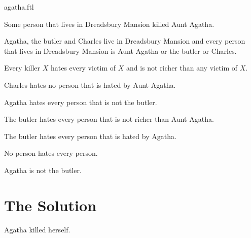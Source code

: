 \documentclass{article}
\begin{document}
\begin{smodule}{agatha.ftl}
  \begin{forthel}
    \begin{axiom}
      Some person that lives in Dreadsbury Mansion killed Aunt Agatha.
    \end{axiom}
    \begin{axiom}
      Agatha, the butler and Charles live in Dreadsbury Mansion and every person that lives in Dreadsbury Mansion is Aunt Agatha or the butler or Charles.
    \end{axiom}
    \begin{axiom}
      Every killer $X$ hates every victim of $X$ and is not richer than any victim of $X$.
    \end{axiom}
    \begin{axiom}
      Charles hates no person that is hated by Aunt Agatha.
    \end{axiom}
    \begin{axiom}
      Agatha hates every person that is not the butler.
    \end{axiom}
    \begin{axiom}
      The butler hates every person that is not richer than Aunt Agatha.
    \end{axiom}
    \begin{axiom}
      The butler hates every person that is hated by Agatha.
    \end{axiom}
    \begin{axiom}
      No person hates every person.
    \end{axiom}
    \begin{axiom}
      Agatha is not the butler.
    \end{axiom}
  \end{forthel}


  \section{The Solution}

  \begin{forthel}
    \begin{theorem}
      Agatha killed herself.
    \end{theorem}
  \end{forthel}
\end{smodule}

\printbibliography
\end{document}
